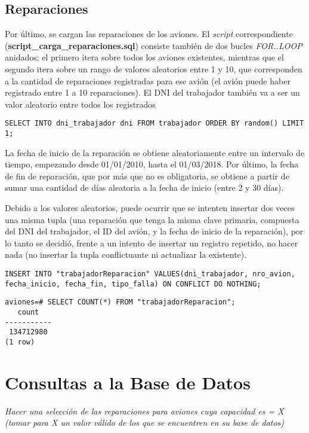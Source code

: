 \subsection{Reparaciones}
Por último, se cargan las reparaciones de los aviones. El \emph{script} correspondiente (\textbf{script\_carga\_reparaciones.sql}) consiste también de dos bucles \emph{FOR..LOOP} anidados; el primero itera sobre todos los aviones existentes, mientras que el segundo itera sobre un rango de valores aleatorios entre 1 y 10, que corresponden a la cantidad de reparaciones registradas para ese avión (el avión puede haber registrado entre 1 a 10 reparaciones). El DNI del trabajador también va a ser un valor aleatorio entre todos los registrados
\vspace*{5mm}
\lstset{style=sql}
\begin{lstlisting}
SELECT INTO dni_trabajador dni FROM trabajador ORDER BY random() LIMIT 1;
\end{lstlisting}

La fecha de inicio de la reparación se obtiene aleatoriamente entre un intervalo de tiempo, empezando desde 01/01/2010, hasta el 01/03/2018. Por último, la fecha de fin de reparación, que por más que no es obligatoria, se obtiene a partir de sumar una cantidad de días aleatoria a la fecha de inicio (entre 2 y 30 días).

Debido a los valores aleatorios, puede ocurrir que se intenten insertar dos veces una misma tupla (una reparación que tenga la misma clave primaria, compuesta del DNI del trabajador, el ID del avión, y la fecha de inicio de la reparación), por lo tanto se decidió, frente a un intento de insertar un registro repetido, no hacer nada (no insertar la tupla conflictuante ni actualizar la existente).

\clearpage
\lstset{style=sql}
\begin{lstlisting}
INSERT INTO "trabajadorReparacion" VALUES(dni_trabajador, nro_avion, fecha_inicio, fecha_fin, tipo_falla) ON CONFLICT DO NOTHING;
\end{lstlisting}

\lstset{style=sql}
\begin{lstlisting}
aviones=# SELECT COUNT(*) FROM "trabajadorReparacion";
   count   
-----------
 134712980
(1 row)
\end{lstlisting}

\section{Consultas a la Base de Datos}
\emph{Hacer una selección de las reparaciones para aviones cuya capacidad es = X (tomar para X un valor válido de los que se encuentren en su base de datos)}

